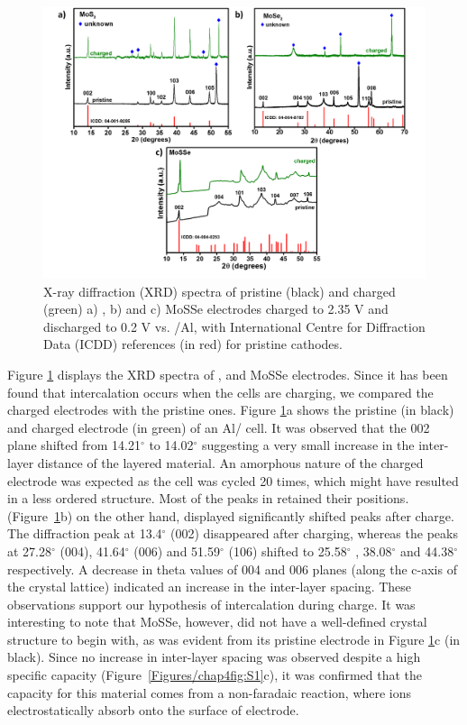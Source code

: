 \begin{figure}[htb!]
\centering
\includegraphics[width=\textwidth]{Figures/chap4fig/XRD}
\caption{X-ray diffraction (XRD) spectra of pristine (black) and charged (green) a) , b)  and c) MoSSe electrodes charged to 2.35 V and discharged to 0.2 V vs. /Al, with International Centre for Diffraction Data (ICDD) references (in red) for pristine cathodes.}
\label{Figures/chap4fig:XRD}
\end{figure}
Figure \ref{Figures/chap4fig:XRD} displays the XRD spectra of ,  and MoSSe electrodes. Since it has been found that intercalation occurs when the cells are charging, we compared the charged electrodes with the pristine ones. Figure \ref{Figures/chap4fig:XRD}a shows the pristine (in black) and charged electrode (in green) of an Al/ cell. It was observed that the 002 plane shifted from 14.21$^\circ$ to 14.02$^\circ$ suggesting a very small increase in the inter-layer distance of the layered material. An amorphous nature of the charged electrode was expected as the cell was cycled 20 times, which might have resulted in a less ordered structure. Most of the peaks in  retained their positions.  (Figure\ \ref{Figures/chap4fig:XRD}b) on the other hand, displayed significantly shifted peaks after charge. The diffraction peak at 13.4$^\circ$ (002) disappeared after charging, whereas the peaks at 27.28$^\circ$ (004), 41.64$^\circ$ (006) and 51.59$^\circ$ (106) shifted to 25.58$^\circ$ , 38.08$^\circ$  and 44.38$^\circ$ respectively. A decrease in theta values of 004 and 006 planes (along the c-axis of the crystal lattice) indicated an increase in the inter-layer spacing. These observations support our hypothesis of  intercalation during charge. It was interesting to note that MoSSe, however, did not have a well-defined crystal structure to begin with, as was evident from its pristine electrode in Figure \ref{Figures/chap4fig:XRD}c (in black). Since no increase in inter-layer spacing was observed despite a high specific capacity (Figure\ \ref{Figures/chap4fig:S1}c), it was confirmed that the capacity for this material comes from a non-faradaic reaction,  where ions electrostatically absorb onto the surface of electrode. 


